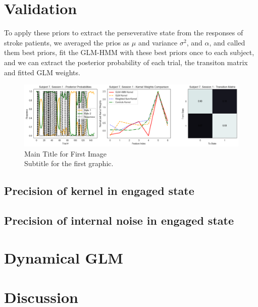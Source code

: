 \section{Validation}
To apply these priors to extract the perseverative state from the responses of stroke patients, we averaged the prios as $\mu$ and variance $\sigma^2$, and $\alpha$, and called them best priors, fit the GLM-HMM with these best priors once to each subject, and we can extract the posterior probability of each trial, the transiton matrix and fitted GLM weights. 
\begin{figure}[H]
    \centering
    \includegraphics[width=16cm]{MainLayout/Images/chapter7/control.png}
    \caption{Main Title for First Image \\ \small Subtitle for the first graphic.}
    \label{fig:patient_responses}
\end{figure}
\subsection{Precision of kernel in engaged state}
\subsection{Precision of internal noise in engaged state}

\section {Dynamical GLM} 

\section {Discussion} 